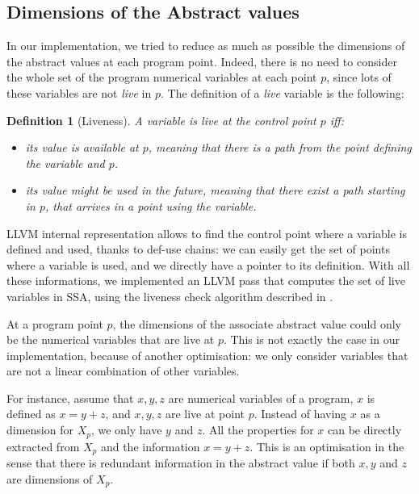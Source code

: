 \documentclass[a4paper,english,titlepage,11pt]{article}
\newtheorem{definition}{Definition}[section]
\begin{document}
	\subsection{Dimensions of the Abstract values}
	
	In our implementation, we tried to reduce as much as possible the dimensions
	of the abstract values at each program point. Indeed, there is no need to
	consider the whole set of the program numerical variables at each point $p$,
	since lots of these variables are not \emph{live} in $p$. 
	The definition of a \emph{live} variable is the following:

	\begin{definition}[Liveness]
	A variable is \emph{live} at the control point $p$ iff:
	\begin{itemize}
	\item its value is available at $p$, meaning that there is a path from the
	point defining the variable and $p$.
	\item its value might be used in the future, meaning that there exist a path
	starting in $p$, that arrives in a point using the variable.
	\end{itemize}
	\end{definition}

	LLVM internal representation allows to find the control point where
	a variable is defined and used, thanks to def-use chains: we can
	easily get the set of points where a variable is used, and we directly have
	a pointer to its definition.
	With all these informations, we implemented an LLVM pass that computes 
	the set of live variables in SSA, using the liveness check algorithm
	described in \cite[section 3.3]{Boi10}.

	
	At a program point $p$, the dimensions of the associate abstract value could
	only be the numerical variables that are live at $p$. This is
	not exactly the case in our implementation, because of another 
	optimisation: we only consider
	variables that are not a linear combination of other variables.

	For instance, assume that $x,y,z$ are numerical variables of a program,
	$x$ is defined as $x = y+z$, and $x,y,z$ are live at point $p$. Instead of having
	$x$ as a dimension for $X_p$, we only have $y$ and $z$. All the properties
	for $x$ can be directly extracted from $X_p$ and the information $x=y+z$.
	This is an optimisation in the sense that there is redundant information in
	the abstract value if both $x,y$ and $z$ are dimensions of $X_p$.
\end{document}
